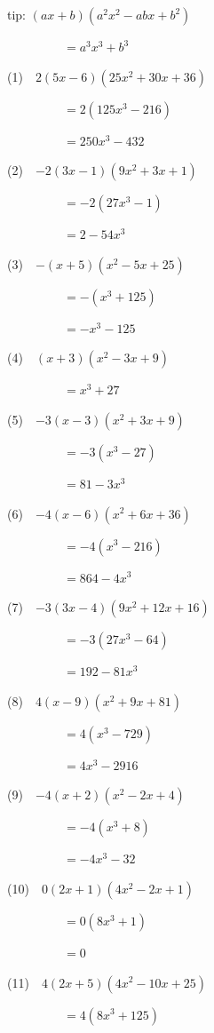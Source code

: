 \documentclass[a4j,twocolumn,10pt,fleqn]{jarticle}
\begin{document}
tip: $\left(a x + b\right) \left(a^{2} x^{2} - a b x + b^{2}\right)$

~~~~~~~~~$=a^{3} x^{3} + b^{3}$


(1)~~$2\left(5 x - 6\right) \left(25 x^{2} + 30 x + 36\right)$

~~~~~~~~~$=2(125 x^{3} - 216)$

~~~~~~~~~$=250 x^{3} - 432$

(2)~~$-2\left(3 x - 1\right) \left(9 x^{2} + 3 x + 1\right)$

~~~~~~~~~$=-2(27 x^{3} - 1)$

~~~~~~~~~$=2 - 54 x^{3}$

(3)~~$-\left(x + 5\right) \left(x^{2} - 5 x + 25\right)$

~~~~~~~~~$=-(x^{3} + 125)$

~~~~~~~~~$=- x^{3} - 125$

(4)~~$\left(x + 3\right) \left(x^{2} - 3 x + 9\right)$

~~~~~~~~~$=x^{3} + 27$

(5)~~$-3\left(x - 3\right) \left(x^{2} + 3 x + 9\right)$

~~~~~~~~~$=-3(x^{3} - 27)$

~~~~~~~~~$=81 - 3 x^{3}$

(6)~~$-4\left(x - 6\right) \left(x^{2} + 6 x + 36\right)$

~~~~~~~~~$=-4(x^{3} - 216)$

~~~~~~~~~$=864 - 4 x^{3}$

(7)~~$-3\left(3 x - 4\right) \left(9 x^{2} + 12 x + 16\right)$

~~~~~~~~~$=-3(27 x^{3} - 64)$

~~~~~~~~~$=192 - 81 x^{3}$

(8)~~$4\left(x - 9\right) \left(x^{2} + 9 x + 81\right)$

~~~~~~~~~$=4(x^{3} - 729)$

~~~~~~~~~$=4 x^{3} - 2916$

(9)~~$-4\left(x + 2\right) \left(x^{2} - 2 x + 4\right)$

~~~~~~~~~$=-4(x^{3} + 8)$

~~~~~~~~~$=- 4 x^{3} - 32$

(10)~~$0\left(2 x + 1\right) \left(4 x^{2} - 2 x + 1\right)$

~~~~~~~~~$=0(8 x^{3} + 1)$

~~~~~~~~~$=0$

(11)~~$4\left(2 x + 5\right) \left(4 x^{2} - 10 x + 25\right)$

~~~~~~~~~$=4(8 x^{3} + 125)$
\end{document}

